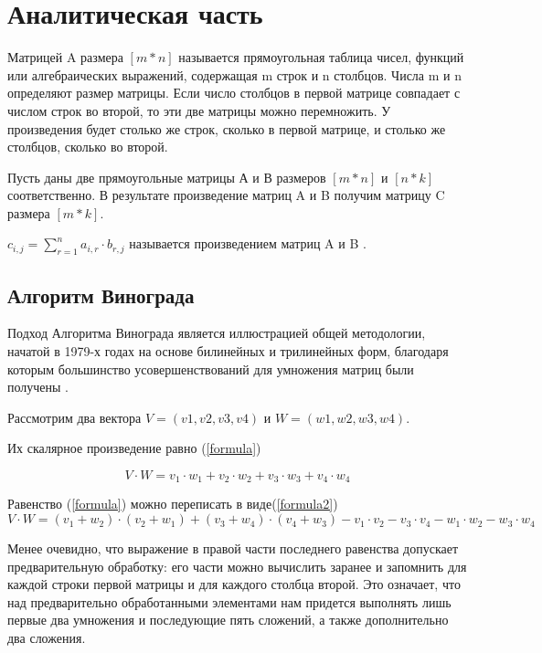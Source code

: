 \documentclass[12pt]{report}
\begin{document}
\chapter{Аналитическая часть}
Матрицей A размера $[m*n]$ называется прямоугольная таблица
чисел, функций или алгебраических выражений, содержащая m строк и n столбцов. Числа m и n определяют размер матрицы.\cite{Beloysov} Если число столбцов в первой матрице совпадает с числом строк во второй, то эти две матрицы можно перемножить. У произведения будет столько же строк, сколько в первой матрице, и столько же столбцов, сколько во второй.

Пусть даны две прямоугольные матрицы А и В размеров $[m * n]$ и $[n * k]$ соответственно.  
В результате произведение матриц A и B получим матрицу C размера $[m *  k]$.


$c_{i,j} = \sum\limits_{r=1}^n a_{i,r}\cdot b_{r,j}$ называется произведением матриц A и B \cite{Beloysov}.


\section{Алгоритм Винограда}
Подход Алгоритма Винограда является иллюстрацией общей методологии, начатой в 1979-х годах на основе
билинейных и трилинейных форм, благодаря которым большинство усовершенствований для умножения матриц были получены \cite{Gall2012}.

Рассмотрим два вектора $V = (v1, v2, v3, v4)$ и $W = (w1, w2, w3, w4)$.  

Их скалярное произведение равно (\ref{formula}) 

\begin{equation} \label{formula}
V \cdot W=v_1 \cdot w_1 + v_2 \cdot w_2 + v_3 \cdot w_3 + v_4 \cdot w_4
\end{equation}

Равенство (\ref{formula}) можно переписать в виде(\ref{formula2}) 
\begin{equation} \label{formula2}
V \cdot W=(v_1 + w_2) \cdot (v_2 + w_1) + (v_3 + w_4) \cdot (v_4 + w_3) - v_1 \cdot v_2 - v_3 \cdot v_4 - w_1 \cdot w_2 - w_3 \cdot w_4
\end{equation}

Менее очевидно, что выражение в правой части последнего равенства допускает предварительную обработку: его части можно вычислить заранее и запомнить для каждой строки первой матрицы и для каждого столбца второй. 
Это означает, что над предварительно обработанными элементами нам придется выполнять лишь первые два умножения и последующие пять сложений, а также дополнительно два сложения. 
\end{document}
